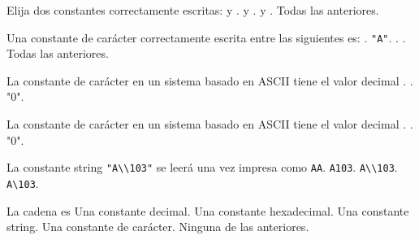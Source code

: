 
\begin{preguntas}
\label{tc-constantes-preg}
\question Elija dos constantes correctamente escritas:
\correctchoice {} y .
\choice {} y .
\choice {} y .
\choice Todas las anteriores.

\question Una constante de carácter correctamente escrita entre las siguientes es:
\choice {}.
\choice \lstinline{"A"}.
\correctchoice {}.
\choice {}.
\choice Todas las anteriores.

\question La constante de carácter  en un sistema basado en ASCII tiene el valor decimal
.
.
\choice "0".

\question La constante de carácter  en un sistema basado en ASCII tiene el valor decimal
.
.
\choice "0".

\question La constante string \lstinline{"A\\103"} se leerá una vez impresa como
\choice \verb+AA+.
\choice \verb+A103+.
\choice \verb+A\\103+.
\correctchoice \verb+A\103+.

\question La cadena  es
\choice Una constante decimal.
\choice Una constante hexadecimal.
\choice Una constante string.
\choice Una constante de carácter.
\correctchoice Ninguna de las anteriores.
\end{preguntas}
